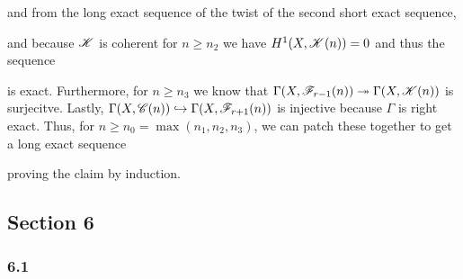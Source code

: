\documentclass[12pt]{article}
\begin{document}
and from the long exact sequence of the twist of the second short exact sequence,
\begin{center}
\end{center}
and because $\mathscr{K}$ is coherent for $n \ge n_2$ we have $H^1(X, \mathscr{K}(n)) = 0$ and thus the sequence
\begin{center}
\end{center}
is exact. 
Furthermore, for $n \ge n_3$ we know that $\Gamma(X, \mathscr{F}_{r-1}(n)) \twoheadrightarrow \Gamma(X, \mathscr{K}(n))$ is surjecitve. Lastly, $\Gamma(X, \mathscr{C}(n)) \hookrightarrow \Gamma(X, \mathscr{F}_{r+1}(n))$ is injective because $\Gamma$ is right exact. Thus, for $n \ge n_0 = \max{(n_1, n_2, n_3)}$, we can patch these together to get a long exact sequence
\begin{center}
\end{center}
proving the claim by induction.

\subsection{Section 6}

\subsubsection{6.1}
\end{document}
